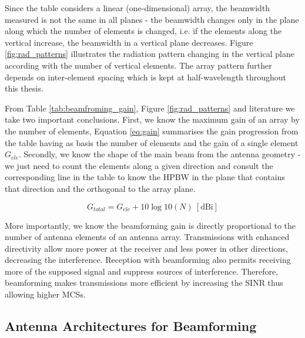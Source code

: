 Since the table considers a linear (one-dimensional) array, the beamwidth measured is not the same in all planes - the beamwidth changes only in the plane along which the number of elements is changed, i.e. if the elements along the vertical increase, the beamwidth in a vertical plane decreases. Figure \ref{fig:rad_patterns} illustrates the radiation pattern changing in the vertical plane according with the number of vertical elements. The array pattern further depends on inter-element spacing which is kept at half-wavelength throughout this thesis.


From Table \ref{tab:beamfroming_gain}, Figure \ref{fig:rad_patterns} and literature we take two important conclusions. First, we know the maximum gain of an array by the number of elements, Equation \eqref{eq:gain} summarises the gain progression from the table having as basis the number of elements and the gain of a single element $G_{ele}$. Secondly, we know the shape of the main beam from the antenna geometry - we just need to count the elements along a given direction and consult the corresponding line in the table to know the \ac{HPBW} in the plane that contains that direction and the orthogonal to the array plane.

\begin{equation} \label{eq:gain}
    G_{total} = G_{ele} + 10 \log10(N) \ [\text{dBi}]
\end{equation}

More importantly, we know the beamforming gain is directly proportional to the number of antenna elements of an antenna array. Transmissions with enhanced directivity allow more power at the receiver and less power in other directions, decreasing the interference. Reception with beamforming also permits receiving more of the supposed signal and suppress sources of interference. Therefore, beamforming makes transmissions more efficient by increasing the \ac{SINR} thus allowing higher \acp{MCS}.


\subsection*{Antenna Architectures for Beamforming} \label{sec:analog_hybrid_digital_bf}

